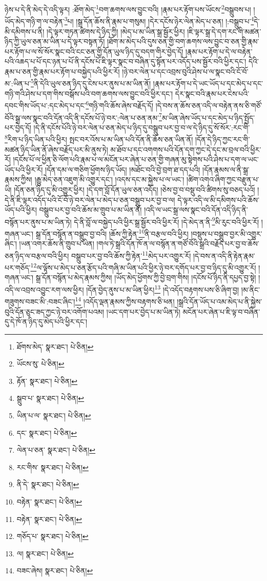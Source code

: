 ཉེས་པ་དེ་ནི་མེད་དེ་འདི་ལྟར། :ཐོག་མེད་\footnote{ཐོགས་མེད་  སྣར་ཐང་།  པེ་ཅིན། }བག་ཆགས་ལས་བྱུང་བའི། །རྣམ་པར་རྟོག་པས་ཡོངས་\footnote{ཡོངས་སུ་  པེ་ཅིན། }བསྒྲུབས་པ། །ཡོད་མེད་གཉི་ག་ལ་བརྟེན་\footnote{རྟོན་  སྣར་ཐང་།  པེ་ཅིན། }པ། །སྒྲ་དོན་ཆོས་ནི་རྣམ་པ་གསུམ། །དེར་དངོས་ཉེར་ལེན་མེད་པ་ཅན། །:བསྒྲུབ་པ་\footnote{སྒྲུབ་པ་  སྣར་ཐང་།  པེ་ཅིན། }དེ་མི་དམིགས་པ་ནི། །དེ་ལྟར་གཏན་ཚིགས་དེ་ཉིད་ཀྱི། །མེད་པ་མ་ཡིན་སྒྲ་སྦྱོར་ཕྱིར། །ཇི་ལྟར་སྒྲ་དེ་དག་རང་གི་མཚན་ཉིད་ཀྱི་ཡུལ་ཅན་མ་ཡིན་པ་དེ་ལྟར་བསྟན་ཏོ། །ཐོག་མ་མེད་པའི་དུས་ཅན་གྱི་བག་ཆགས་ལས་བྱུང་བ་ཅན་གྱི་རྣམ་པར་རྟོག་པ་ལ་སོ་སོར་སྣང་བའི་ངང་ཅན་གྱི་དོན་ཡུལ་ཉིད་དུ་བདག་གིར་བྱེད་དོ། །རྣམ་པར་རྟོག་པ་དེ་ལ་བརྟེན་པའི་འཆད་པ་པོ་དང་ཉན་པ་པོ་ནི་དངོས་པོ་ཇི་ལྟར་སྣང་བ་བཞིན་དུ་སྟོན་པར་འདོད་པས་སྦྱོར་བའི་ཕྱིར་དང་། དེའི་རྣམ་པ་ཅན་གྱི་རྣམ་པར་རྟོག་པ་བསྐྱེད་པའི་ཕྱིར་རོ། །ཉེ་བར་ལེན་པ་དང་འབྲས་བུའི་ཤེས་པ་ལ་སྣང་བའི་ངོ་བོ་མ་:ཡིན་པ་\footnote{ཡིན་པ་ལ་  སྣར་ཐང་།  པེ་ཅིན། }ནི་དེའི་ཡུལ་ཅན་ཉིད་དུ་ངེས་པར་ནུས་པ་མ་ཡིན་ནོ། །རྣམ་པར་རྟོག་པ་དེ་ཡང་ཡོད་པ་དང་མེད་པ་དང་གཉི་གའི་ཤེས་པ་དག་གིས་བསྒོས་པའི་བག་ཆགས་ལས་བྱུང་བའི་ཕྱིར་དང་། དེར་སྣང་བའི་རྣམ་པར་ངེས་པའི་དབང་གིས་ཡོད་པ་:དང་མེད་པ་དང་\footnote{དང་  སྣར་ཐང་།  པེ་ཅིན། }གཉི་གའི་ཆོས་ཞེས་བརྗོད་དོ། །དེ་བས་ན་ཆོས་ཅན་འདི་ལ་བརྟེན་ནས་ཅི་གཙོ་བོའི་སྒྲ་ལས་སྣང་བའི་དོན་འདི་ནི་དངོས་པོ་ཉེ་བར་:ལེན་པ་ཅན་ནམ་\footnote{ལེན་པ་ཅན་  སྣར་ཐང་།  པེ་ཅིན། }མ་ཡིན་ཞེས་ཡོད་པ་དང་མེད་པ་ཉིད་སྤྱོད་པར་བྱེད་དོ། །དེ་ནི་དངོས་པོའི་ཉེ་བར་ལེན་པ་ཅན་མེད་པ་ཉིད་དུ་བསྒྲུབ་པར་བྱ་བ་ལ་དེ་ཉིད་དུ་སོ་སོར་:རང་གི་\footnote{རང་གིས་  སྣར་ཐང་།  པེ་ཅིན། }རིག་པ་ཉིད་ཡིན་པའི་ཕྱིར། སྤང་བར་འོས་པ་མ་ཡིན་པའི་དོན་ནི་ཆོས་ཅན་ཡིན་ནོ། །དོན་དེ་ཉིད་ཀྱང་རང་གི་མཚན་ཉིད་ཡིན་ནོ་ཞེས་བརྗོད་པར་མི་ནུས་ཏེ། མ་ཐོབ་པ་དང་འགགས་པའི་དོན་དག་ཀྱང་དེ་དང་མ་བྲལ་བའི་ཕྱིར་རོ། །དངོས་པོ་ལ་ཕྱིན་ཅི་ལོག་པའི་རྣམ་པ་ལ་མངོན་པར་ཞེན་པ་ཅན་གྱི་གཞན་མུ་སྟེགས་པའི་ཤེས་པ་དག་ལ་ཡང་ཡོད་པའི་ཕྱིར་རོ། །དོན་དམ་ལ་གཅིག་ཕྱོགས་ཉིད་ཡོད། །མཐོང་བའི་བྱེ་བྲག་ཐ་དད་པའི། །དོན་རྣམས་ལ་ནི་སྒྲ་རྣམས་ཀྱིས། །རྒྱུ་མེད་ཅན་འཇུག་མི་འགྱུར་དང་། །འདས་དང་མ་སྐྱེས་པ་ལ་ཡང་། །ཚིག་འགའ་ཞིག་ཀྱང་བརྫུན་པ་ཡི། །དོན་ཅན་ཉིད་དུ་མི་འགྱུར་ཕྱིར། །དེ་དག་བློ་དོན་ཡུལ་ཅན་འདོད། །ཅེས་བྱ་བ་བསྡུ་བའི་ཚིགས་སུ་བཅད་པའོ། །དེ་ནི་ཇི་ལྟར་འདོད་པའི་ངོ་བོ་ཉེ་བར་ལེན་པ་མེད་པ་ཅན་བསྒྲུབ་པར་བྱ་བ་ལ། དེ་ལྟར་འདི་ལ་མི་དམིགས་པའི་ཆོས་ཡོད་པའི་ཕྱིར། བསྒྲུབ་པར་བྱ་བའི་ཆོས་མ་གྲུབ་པ་མ་ཡིན་ནོ། །འདི་ལ་ཡང་སྒྲ་ལས་སྣང་བའི་དོན་འདི་ཉིད་ནི་བསྙོན་པར་ནུས་པ་མ་ཡིན་ཏེ། དེ་ནི་བློ་ལ་བསྐྱེད་པའི་ཕྱིར་སྒྲ་སྦྱོར་བའི་ཕྱིར་རོ། །དེ་མེད་ན་ནི་\footnote{ནི་དེ་  སྣར་ཐང་།  པེ་ཅིན། }མི་རུང་བའི་ཕྱིར་རོ། །གཞན་ཡང་། སྒྲ་དོན་བསྙོན་ན་བསྒྲུབ་བྱ་བའི། །ཆོས་ཀྱི་རྟེན་\footnote{བརྟེན་  སྣར་ཐང་།  པེ་ཅིན། }ནི་བརྩལ་བའི་ཕྱིར། །བསྡུས་པ་བསྒྲུབ་བྱར་མི་འགྱུར་ཞིང་། །ཡན་འགར་ཆོས་ནི་གྲུབ་པ་ཡིན། །གལ་ཏེ་སྒྲའི་དོན་ཁོ་ན་ལ་བསྙོན་ན་གཙོ་བོའི་སྒྲའི་བརྗོད་པར་བྱ་བ་ཆོས་ཅན་ཉིད་ལ་བརྩལ་བའི་ཕྱིར། བསྒྲུབ་པར་བྱ་བའི་ཆོས་ཀྱི་རྟེན་\footnote{བརྟེན་  སྣར་ཐང་།  པེ་ཅིན། }མེད་པར་འགྱུར་རོ། །དེ་བས་ན་འདི་ནི་རྟེན་རྣམ་པར་གཅོད་\footnote{གཅོད་པ་  སྣར་ཐང་།  པེ་ཅིན། }ལ་ལྟོས་པ་མེད་པ་ཅན་རྩོད་པའི་གཞི་མ་ཡིན་པའི་ཕྱིར་ཉེ་བར་དགོད་པར་བྱ་བ་ཉིད་དུ་མི་འགྱུར་རོ། །གཞན་ཡང་། སྒྲ་དོན་བསྙོན་པ་མེད་རྣམས་ཀྱིས། །ཡོད་མེད་ཕྱོགས་ཀྱི་བྱེ་བྲག་གིས། །དངོས་པོ་ཉིད་ནི་དཔྱད་བྱ་སྟེ། །འདི་ལ་འབྲས་འབྱུང་རག་ལས་ཕྱིར། །དོན་བྱེད་ནུས་པ་མ་ཡིན་ཕྱིར།\footnote{ལ།  སྣར་ཐང་།  པེ་ཅིན། } །དེ་འདོད་བརྟགས་པས་ཅི་ཞིག་བྱ། །མ་ནིང་གཟུགས་བཟང་མི་:བཟང་ཞིང་།\footnote{བཟང་ཞེས།  སྣར་ཐང་།  པེ་ཅིན། } །འདོད་ལྡན་རྣམས་ཀྱིས་བརྟགས་ཅི་ཕན། །སྒྲའི་དོན་ཡོད་པ་འམ་མེད་པ་ནི་སྐྱེས་བུའི་དོན་ཅུང་ཟད་ཀྱང་ཉེ་བར་འགོག་པའམ། །ཡང་དག་པར་བྱེད་པ་མ་ཡིན་ཏེ། མངོན་པར་ཞེན་པ་ཇི་ལྟ་བ་བཞིན་དུ་དེ་ཁོ་ན་ཉིད་དུ་མེད་པའི་ཕྱིར་དང་། 